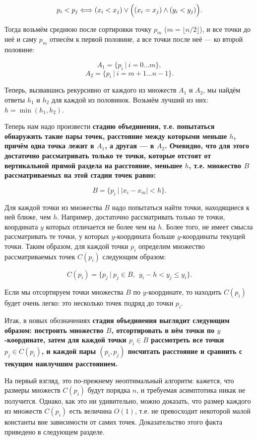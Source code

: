 $$ p_i < p_j \Longleftrightarrow (x_i < x_j) \lor \Bigl( (x_i = x_j) \land (y_i < y_j) \Bigr). $$

Тогда возьмём среднюю после сортировки точку $p_m$ ($m = \lfloor n/2 \rfloor$), и все точки до неё и саму $p_m$ отнесём к первой половине, а все точки после неё --- ко второй половине:

$$ A_1 = \{ p_i\ |\ i = 0 \ldots m \}, $$
$$ A_2 = \{ p_i\ |\ i = m+1 \ldots n-1 \}. $$

Теперь, вызвавшись рекурсивно от каждого из множеств $A_1$ и $A_2$, мы найдём ответы $h_1$ и $h_2$ для каждой из половинок. Возьмём лучший из них: $h = \min (h_1, h_2)$.

Теперь нам надо произвести \bf{стадию объединения}, т.е. попытаться обнаружить такие пары точек, расстояние между которыми меньше $h$, причём одна точка лежит в $A_1$, а другая --- в $A_2$. Очевидно, что для этого достаточно рассматривать только те точки, которые отстоят от вертикальной прямой раздела на расстояние, меньшее $h$, т.е. множество $B$ рассматриваемых на этой стадии точек равно:

$$ B = \{ p_i\ |\ | x_i - x_m | < h \}. $$

Для каждой точки из множества $B$ надо попытаться найти точки, находящиеся к ней ближе, чем $h$. Например, достаточно рассматривать только те точки, координата $y$ которых отличается не более чем на $h$. Более того, не имеет смысла рассматривать те точки, у которых $y$-координата больше $y$-координаты текущей точки. Таким образом, для каждой точки $p_i$ определим множество рассматриваемых точек $C(p_i)$ следующим образом:

$$ C(p_i) = \{ p_j\ |\ p_j \in B,\ \ y_i - h < y_j \le y_i \}. $$

Если мы отсортируем точки множества $B$ по $y$-координате, то находить $C(p_i)$ будет очень легко: это несколько точек подряд до точки $p_i$.

Итак, в новых обозначениях \bf{стадия объединения} выглядит следующим образом: построить множество $B$, отсортировать в нём точки по $y$-координате, затем для каждой точки $p_i \in B$ рассмотреть все точки $p_j \in C(p_i)$, и каждой пары $(p_i,p_j)$ посчитать расстояние и сравнить с текущим наилучшим расстоянием.

На первый взгляд, это по-прежнему неоптимальный алгоритм: кажется, что размеры множеств $C(p_i)$ будут порядка $n$, и требуемая асимптотика никак не получится. Однако, как это ни удивительно, можно доказать, что размер каждого из множеств $C(p_i)$ есть величина $O(1)$, т.е. не превосходит некоторой малой константы вне зависимости от самих точек. Доказательство этого факта приведено в следующем разделе.

